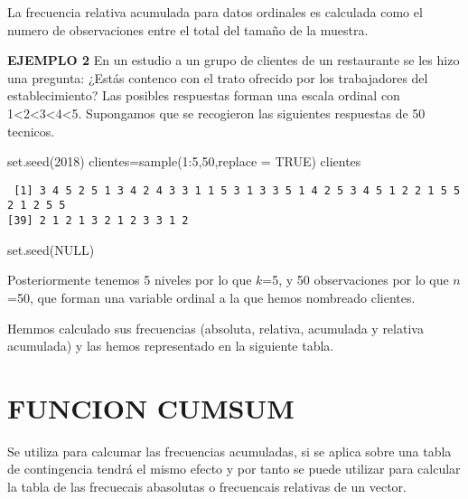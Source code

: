\documentclass[
]{article}
\newenvironment{Shaded}{\begin{snugshade}}{\end{snugshade}}
\newcommand{\AttributeTok}[1]{\textcolor[rgb]{0.77,0.63,0.00}{#1}}
\newcommand{\ConstantTok}[1]{\textcolor[rgb]{0.00,0.00,0.00}{#1}}
\newcommand{\DecValTok}[1]{\textcolor[rgb]{0.00,0.00,0.81}{#1}}
\newcommand{\FunctionTok}[1]{\textcolor[rgb]{0.00,0.00,0.00}{#1}}
\newcommand{\NormalTok}[1]{#1}
\newcommand{\OtherTok}[1]{\textcolor[rgb]{0.56,0.35,0.01}{#1}}
\newcommand{\SpecialCharTok}[1]{\textcolor[rgb]{0.00,0.00,0.00}{#1}}
\begin{document}
La frecuencia relativa acumulada para datos ordinales es calculada como
el numero de observaciones entre el total del tamaño de la muestra.

\textbf{EJEMPLO 2} En un estudio a un grupo de clientes de un
restaurante se les hizo una pregunta: ¿Estás contenco con el trato
ofrecido por los trabajadores del establecimiento? Las posibles
respuestas forman una escala ordinal con
1\textless2\textless3\textless4\textless5. Supongamos que se recogieron
las siguientes respuestas de 50 tecnicos.

\begin{Shaded}
\begin{Highlighting}[]
\FunctionTok{set.seed}\NormalTok{(}\DecValTok{2018}\NormalTok{)}
\NormalTok{clientes}\OtherTok{=}\FunctionTok{sample}\NormalTok{(}\DecValTok{1}\SpecialCharTok{:}\DecValTok{5}\NormalTok{,}\DecValTok{50}\NormalTok{,}\AttributeTok{replace =} \ConstantTok{TRUE}\NormalTok{)}
\NormalTok{clientes}
\end{Highlighting}
\end{Shaded}

\begin{verbatim}
 [1] 3 4 5 2 5 1 3 4 2 4 3 3 1 1 5 3 1 3 3 5 1 4 2 5 3 4 5 1 2 2 1 5 5 2 1 2 5 5
[39] 2 1 2 1 3 2 1 2 3 3 1 2
\end{verbatim}

\begin{Shaded}
\begin{Highlighting}[]
\FunctionTok{set.seed}\NormalTok{(}\ConstantTok{NULL}\NormalTok{)}
\end{Highlighting}
\end{Shaded}

Posteriormente tenemos 5 niveles por lo que \(k\)=5, y 50 observaciones
por lo que \(n\)=50, que forman una variable ordinal a la que hemos
nombreado clientes.

Hemmos calculado sus frecuencias (absoluta, relativa, acumulada y
relativa acumulada) y las hemos representado en la siguiente tabla.

\hypertarget{funcion-cumsum}{%
\section{FUNCION CUMSUM}\label{funcion-cumsum}}

Se utiliza para calcumar las frecuencias acumuladas, si se aplica sobre
una tabla de contingencia tendrá el mismo efecto y por tanto se puede
utilizar para calcular la tabla de las frecuecais abasolutas o
frecuencais relativas de un vector.
\end{document}
